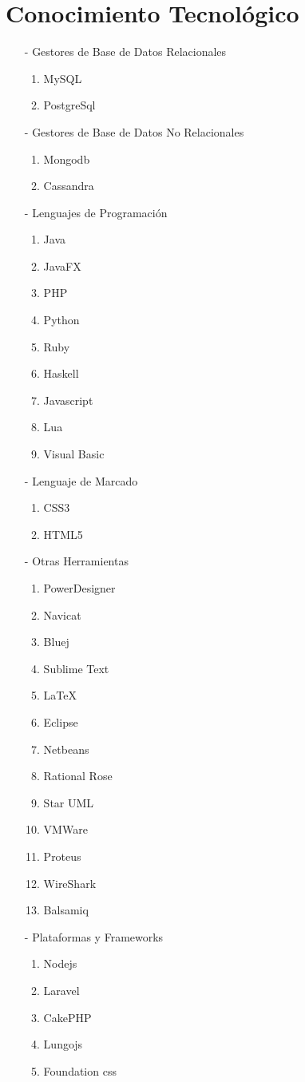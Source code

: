 \documentclass[11pt,letterpaper]{report}
\begin{document}
\section{ Conocimiento Tecnol\'ogico }

\begin{itemize}
\item[-] Gestores de Base de Datos Relacionales
\begin{enumerate}
\item MySQL
\item PostgreSql
\end{enumerate}
\item[-] Gestores de Base de Datos No Relacionales
\begin{enumerate}
\item Mongodb
\item Cassandra
\end{enumerate}
\item[-] Lenguajes de Programación
\begin{enumerate}
\item Java
\item JavaFX
\item PHP
\item Python
\item Ruby
\item Haskell
\item Javascript
\item Lua
\item Visual Basic
\end{enumerate}
\item[-] Lenguaje de Marcado
\begin{enumerate}
\item CSS3
\item HTML5
\end{enumerate}
\item[-] Otras Herramientas
\begin{enumerate}
\item PowerDesigner
\item Navicat
\item Bluej
\item Sublime Text
\item \LaTeX
\item Eclipse
\item Netbeans
\item Rational Rose
\item Star UML
\item VMWare
\item Proteus
\item WireShark
\item Balsamiq
\end{enumerate}
\item[-] Plataformas y Frameworks
\begin{enumerate}
\item Nodejs
\item Laravel
\item CakePHP
\item Lungojs
\item Foundation css 
\end{enumerate}


\end{itemize}
\end{document}
